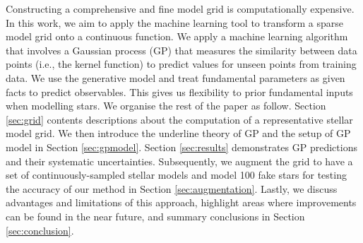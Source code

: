 Constructing a comprehensive and fine model grid is computationally expensive. In this work, we aim to apply the machine learning tool to transform a sparse model grid onto a continuous function. We apply a machine learning algorithm that involves a Gaussian process (GP) that measures the similarity between data points (i.e., the kernel function) to predict values for unseen points from training data. We use the generative model and treat fundamental parameters as given facts to predict observables. This gives us flexibility to prior fundamental inputs when modelling stars. We organise the rest of the paper as follow. Section \ref{sec:grid} contents descriptions about the computation of a representative stellar model grid. We then introduce the underline theory of GP and the setup of GP model in Section \ref{sec:gpmodel}. Section \ref{sec:results} demonstrates GP predictions and their systematic uncertainties. Subsequently, we augment the grid to have a set of continuously-sampled stellar models and model 100 fake stars for testing the accuracy of our method in Section \ref{sec:augmentation}. Lastly, we discuss advantages and limitations of this approach, highlight areas where improvements can be found in the near future, and summary conclusions in Section \ref{sec:conclusion}.










